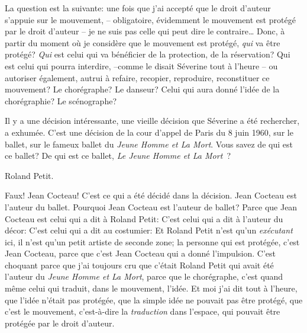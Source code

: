 {La question est la suivante: une fois que j'ai accept\'e que le droit
d'auteur s'appuie sur le mouvement, {--} obligatoire, \'evidemment le
mouvement est prot\'eg\'e par le droit d'auteur {--} je ne suis pas
celle qui peut dire le contraire{\dots} Donc, \`a partir du moment o\`u
je consid\`ere que le mouvement est prot\'eg\'e, {\em qui} va \^etre
prot\'eg\'e? {\em Qui} est celui qui va b\'en\'eficier de la
protection, de la r\'eservation? Qui est celui qui pourra interdire,
{--}comme le disait S\'everine tout \`a l'heure {--} ou autoriser
\'egalement, autrui \`a refaire, recopier, reproduire, reconstituer ce
mouvement? Le chor\'egraphe? Le danseur? Celui qui aura donn\'e
l'id\'ee de la chor\'egraphie? Le sc\'enographe?\par

Il y a une d\'ecision int\'eressante, une vieille d\'ecision que
S\'everine a \'et\'e rechercher, a exhum\'ee. C'est une d\'ecision de
la cour d'appel de Paris du 8 juin 1960, sur le ballet, sur le fameux
ballet du {\em Jeune Homme et La Mort}. Vous savez de qui est ce
ballet? De qui est ce ballet, {\em Le Jeune Homme et La Mort~}?\par

Roland Petit.\par

Faux! Jean Cocteau! C'est ce qui a \'et\'e d\'ecid\'e dans la
d\'ecision. Jean Cocteau est l'auteur du ballet. Pourquoi Jean Cocteau
est l'auteur de ballet? Parce que Jean Cocteau est celui qui a dit \`a
Roland Petit:  C'est celui qui a dit \`a
l'auteur du d\'ecor:  C'est celui qui a dit au costumier:  Et Roland Petit n'est qu'un {\em ex\'ecutant} ici,
il n'est qu'un petit artiste de seconde zone; la personne qui est
prot\'eg\'ee, c'est Jean Cocteau, parce que c'est Jean Cocteau qui a
donn\'e l'impulsion. C'est choquant parce que j'ai toujours cru que
c'\'etait Roland Petit qui avait \'et\'e l'auteur du {\em Jeune
Homme et La Mort}, parce que le chor\'egraphe, c'est quand m\^eme celui
qui traduit, dans le mouvement, l'id\'ee. Et moi j'ai dit tout \`a
l'heure, que l'id\'ee n'\'etait pas prot\'eg\'ee, que la simple id\'ee
ne pouvait pas \^etre prot\'eg\'e, que c'est le mouvement,
c'est{}-\`a{}-dire la {\em traduction} dans l'espace, qui pouvait
\^etre prot\'eg\'ee par le droit d'auteur.\par

}
